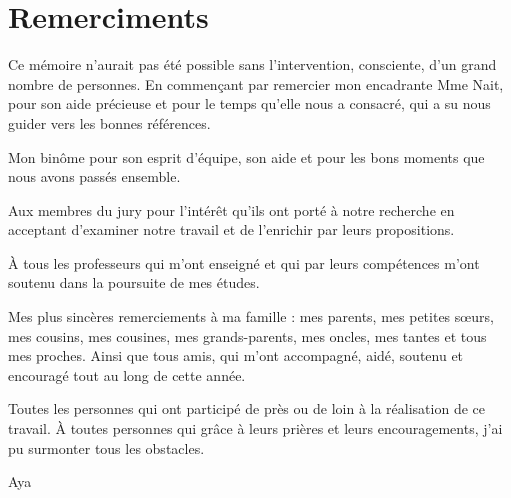 \chapter*{Remerciments}


Ce mémoire n'aurait pas été possible sans l’intervention, consciente, d’un grand nombre de personnes.
En commençant par remercier mon encadrante Mme Nait, pour son aide précieuse et pour le temps qu’elle nous a consacré, qui a su nous guider vers les bonnes références.

Mon binôme pour son esprit d'équipe, son aide et pour les bons moments que nous avons passés ensemble.

Aux membres du jury pour l’intérêt qu’ils ont porté à notre recherche en acceptant d’examiner notre travail et de l’enrichir par leurs propositions.

À tous les professeurs qui m’ont enseigné et qui par leurs compétences m’ont soutenu dans la poursuite de mes études.

Mes plus sincères remerciements à ma famille : mes parents, mes petites sœurs, mes cousins, mes cousines, mes grands-parents, mes oncles, mes tantes et tous mes proches. Ainsi que tous amis, qui m'ont accompagné, aidé, soutenu et encouragé tout au long de cette année.

Toutes les personnes qui ont participé de près ou de loin à la réalisation de ce travail. À toutes personnes qui grâce à leurs prières et leurs encouragements, j’ai pu surmonter tous les obstacles.

Aya


\clearpage